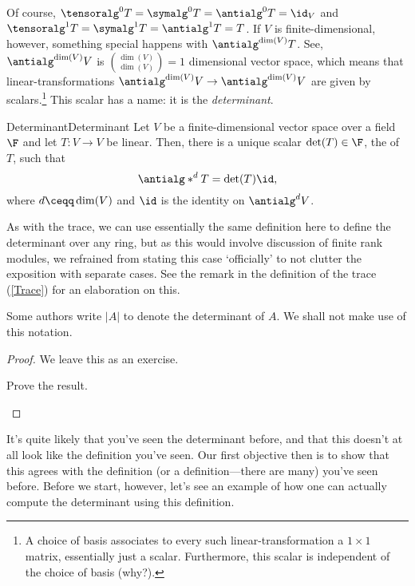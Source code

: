 Of course, $\tensoralg ^0T=\symalg ^0T=\antialg ^0T=\id _V$ and $\tensoralg ^1T=\symalg ^1T=\antialg ^1T=T$.  If $V$ is finite-dimensional, however, something special happens with $\antialg ^{\dim (V)}T$.  See, $\antialg ^{\dim (V)}V$ is $\binom{\dim (V)}{\dim (V)}=1$ dimensional vector space, which means that linear-transformations $\antialg ^{\dim (V)}V\rightarrow \antialg ^{\dim (V)}V$ are given by scalars.\footnote{A choice of basis associates to every such linear-transformation a $1\times 1$ matrix, essentially just a scalar.  Furthermore, this scalar is independent of the choice of basis (why?).}  This scalar has a name:  it is the \emph{determinant}.
\begin{thm}{Determinant}{Determinant}
	Let $V$ be a finite-dimensional vector space over a field $\F$ and let $T\colon V\rightarrow V$ be linear.  Then, there is a unique scalar $\det (T)\in \F$, the  of $T$, such that
	\begin{equation}
		\antialg* ^dT=\det (T)\id ,
	\end{equation}
	where $d\ceqq \dim (V)$ and $\id$ is the identity on $\antialg ^dV$.
	\begin{rmk}
		As with the trace, we can use essentially the same definition here to define the determinant over any ring, but as this would involve discussion of finite rank modules, we refrained from stating this case `officially' to not clutter the exposition with separate cases.  See the remark in the definition of the trace (\cref{Trace}) for an elaboration on this.
	\end{rmk}
	\begin{rmk}
		Some authors write $|A|$ to denote the determinant of $A$.  We shall not make use of this notation.
	\end{rmk}
	\begin{proof}
		We leave this as an exercise.
		\begin{exr}[breakable=false]{}{}
			Prove the result.
		\end{exr}
	\end{proof}
\end{thm}
It's quite likely that you've seen the determinant before, and that this doesn't at all look like the definition you've seen.  Our first objective then is to show that this agrees with the definition (or a definition---there are many) you've seen before.  Before we start, however, let's see an example of how one can actually compute the determinant using this definition.
